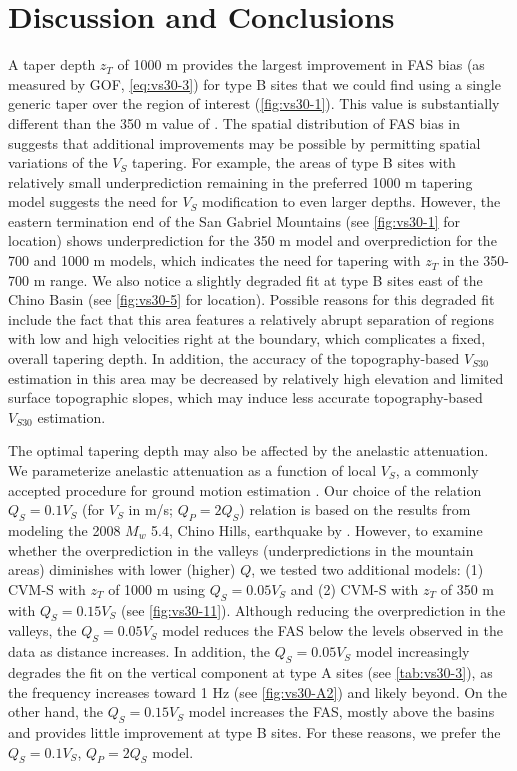 \section{Discussion and Conclusions}
A taper depth $z_T$ of 1000 m provides the largest improvement in FAS bias (as measured by GOF, \cref{eq:vs30-3}) for type B sites that we could find using a single generic taper over the region of interest (\cref{fig:vs30-1}). This value is substantially different than the 350 m value of \citet{elyVs30derivedNearsurfaceSeismic2010}. The spatial distribution of FAS bias in  suggests that additional improvements may be possible by permitting spatial variations of the $V_S$ tapering. For example, the areas of type B sites with relatively small underprediction remaining in the preferred 1000 m tapering model suggests the need for $V_S$ modification to even larger depths. However, the eastern termination end of the San Gabriel Mountains (see \cref{fig:vs30-1} for location) shows underprediction for the 350 m model and overprediction for the 700 and 1000 m models, which indicates the need for tapering with $z_T$ in the 350-700 m range. We also notice a slightly degraded fit at type B sites east of the Chino Basin (see \cref{fig:vs30-5} for location). Possible reasons for this degraded fit include the fact that this area features a relatively abrupt separation of regions with low and high velocities right at the boundary, which complicates a fixed, overall tapering depth. In addition, the accuracy of the topography-based $V_{S30}$ estimation in this area may be decreased by relatively high elevation and limited surface topographic slopes, which may induce less accurate topography-based $V_{S30}$ estimation.

The optimal tapering depth may also be affected by the anelastic attenuation. We parameterize anelastic attenuation as a function of local $V_S$, a commonly accepted procedure for ground motion estimation . Our choice of the relation $Q_S=0.1V_S$ (for $V_S$ in m/s; $Q_P=2Q_S$) relation is based on the results from modeling the 2008 $M_w$ 5.4, Chino Hills, earthquake by \citet{savranModelSmallscaleCrustal2016}. However, to examine whether the overprediction in the valleys (underpredictions in the mountain areas) diminishes with lower (higher) $Q$, we tested two additional models: (1) CVM-S with $z_T$ of 1000 m using $Q_S=0.05V_S$ and (2) CVM-S with $z_T$ of 350 m with $Q_S=0.15V_S$ (see \cref{fig:vs30-11}). Although reducing the overprediction in the valleys, the $Q_S=0.05V_S$ model reduces the FAS below the levels observed in the data as distance increases. In addition, the $Q_S=0.05V_S$ model increasingly degrades the fit on the vertical component at type A sites (see \cref{tab:vs30-3}), as the frequency increases toward 1 Hz (see \cref{fig:vs30-A2}) and likely beyond. On the other hand, the $Q_S=0.15V_S$ model increases the FAS, mostly above the basins and provides little improvement at type B sites. For these reasons, we prefer the $Q_S=0.1V_S$, $Q_P=2Q_S$ model.


